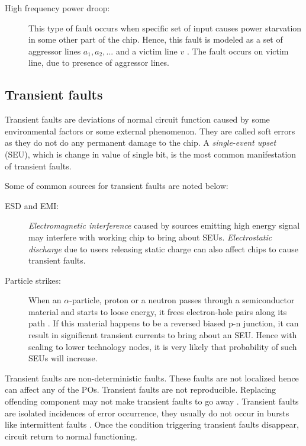\begin{description}
\item[High frequency power droop:] This type of fault occurs when specific set of input causes power starvation in some other part of the chip. Hence, this fault is modeled as a set of aggressor lines $a_1,a_2,...$ and a victim line $v$ \cite{Polian2007}. The fault occurs on victim line, due to presence of aggressor lines.
\end{description}

\subsection{Transient faults}
\label{sec:sectf}
Transient faults are  deviations of normal circuit function caused by some  environmental factors or some external phenomenon. They are called soft errors as they do not do any permanent damage to the chip. A \emph{single-event upset} (SEU), which is change in value of single bit, is the most common manifestation of transient faults.


Some of common sources for transient faults are noted below:
\begin{description}
\item [ESD and EMI:] \emph{Electromagnetic interference} caused by sources emitting high energy signal may interfere with working chip to bring about SEUs. \emph{Electrostatic discharge} due to users releasing static charge can also affect chips to cause transient faults.

\item[Particle strikes:] When an $\alpha$-particle, proton or a neutron passes through a semiconductor material and starts to loose energy, it frees electron-hole pairs along its path \cite{Dodd2003}. If this material happens to be a reversed biased p-n junction, it can result in significant transient currents to bring about an SEU. Hence with scaling to lower technology nodes, it is very likely that probability of such SEUs will increase.

\end{description}


Transient faults are non-deterministic faults. These faults are not localized hence can affect any of the POs. Transient faults are not reproducible. Replacing offending component may not make transient faults to go away \cite{Constantinescu2007}. Transient faults are isolated incidences of error occurrence, they usually do not occur in bursts like intermittent faults \cite{Constantinescu2007, Constantinescu2003}. Once the condition triggering transient faults disappear, circuit return to normal functioning.

